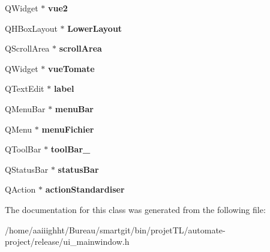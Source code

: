 \begin{DoxyCompactItemize}
\item 
\hypertarget{class_ui___main_window_adc8b81436897eb53d06cf5491f5d5e09}{Q\-Widget $\ast$ {\bfseries vue2}}\label{class_ui___main_window_adc8b81436897eb53d06cf5491f5d5e09}

\item 
\hypertarget{class_ui___main_window_ac89148d0a6b333eb74b3ef8a7408ce09}{Q\-H\-Box\-Layout $\ast$ {\bfseries Lower\-Layout}}\label{class_ui___main_window_ac89148d0a6b333eb74b3ef8a7408ce09}

\item 
\hypertarget{class_ui___main_window_a5f80e22900f6e658019f6c50cbffea81}{Q\-Scroll\-Area $\ast$ {\bfseries scroll\-Area}}\label{class_ui___main_window_a5f80e22900f6e658019f6c50cbffea81}

\item 
\hypertarget{class_ui___main_window_a568bb8d49bc030a72568d6f3737fd180}{Q\-Widget $\ast$ {\bfseries vue\-Tomate}}\label{class_ui___main_window_a568bb8d49bc030a72568d6f3737fd180}

\item 
\hypertarget{class_ui___main_window_aaaf53df148a855801161abb4290683a0}{Q\-Text\-Edit $\ast$ {\bfseries label}}\label{class_ui___main_window_aaaf53df148a855801161abb4290683a0}

\item 
\hypertarget{class_ui___main_window_a502a50d7dc22415f511336bdfb4318b9}{Q\-Menu\-Bar $\ast$ {\bfseries menu\-Bar}}\label{class_ui___main_window_a502a50d7dc22415f511336bdfb4318b9}

\item 
\hypertarget{class_ui___main_window_a7ab5b88372fc7887d782937113c0ebbb}{Q\-Menu $\ast$ {\bfseries menu\-Fichier}}\label{class_ui___main_window_a7ab5b88372fc7887d782937113c0ebbb}

\item 
\hypertarget{class_ui___main_window_a0984bccf02cc63fd5cd1810af9e37185}{Q\-Tool\-Bar $\ast$ {\bfseries tool\-Bar\-\_}}\label{class_ui___main_window_a0984bccf02cc63fd5cd1810af9e37185}

\item 
\hypertarget{class_ui___main_window_afa919f3af6f2f526a70f1fa331f63724}{Q\-Status\-Bar $\ast$ {\bfseries status\-Bar}}\label{class_ui___main_window_afa919f3af6f2f526a70f1fa331f63724}

\item 
\hypertarget{class_ui___main_window_aaa9d9c6e15ff9d685f907e3d15bcb2ee}{Q\-Action $\ast$ {\bfseries action\-Standardiser}}\label{class_ui___main_window_aaa9d9c6e15ff9d685f907e3d15bcb2ee}

\end{DoxyCompactItemize}


The documentation for this class was generated from the following file\-:\begin{DoxyCompactItemize}
\item 
/home/aaiiighht/\-Bureau/smartgit/bin/projet\-T\-L/automate-\/project/release/ui\-\_\-mainwindow.\-h\end{DoxyCompactItemize}
